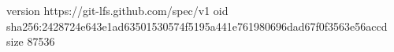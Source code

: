 version https://git-lfs.github.com/spec/v1
oid sha256:2428724e643e1ad63501530574f5195a441e761980696dad67f0f3563e56accd
size 87536
